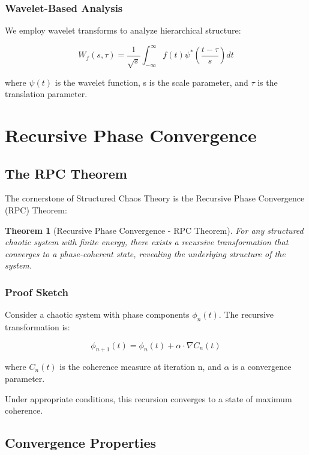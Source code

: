 \documentclass[12pt]{article}
\newtheorem{theorem}{Theorem}
\begin{document}
\subsubsection{Wavelet-Based Analysis}

We employ wavelet transforms to analyze hierarchical structure:

\begin{equation}
W_f(s,\tau) = \frac{1}{\sqrt{s}} \int_{-\infty}^{\infty} f(t) \psi^*\left(\frac{t-\tau}{s}\right) dt
\end{equation}

where $\psi(t)$ is the wavelet function, s is the scale parameter, and $\tau$ is the translation parameter.

\section{Recursive Phase Convergence}

\subsection{The RPC Theorem}

The cornerstone of Structured Chaos Theory is the Recursive Phase Convergence (RPC) Theorem:

\begin{theorem}[Recursive Phase Convergence - RPC Theorem]
For any structured chaotic system with finite energy, there exists a recursive transformation that converges to a phase-coherent state, revealing the underlying structure of the system.
\end{theorem}

\subsubsection{Proof Sketch}

Consider a chaotic system with phase components $\phi_n(t)$. The recursive transformation is:

\begin{equation}
\phi_{n+1}(t) = \phi_n(t) + \alpha \cdot \nabla C_n(t)
\end{equation}

where $C_n(t)$ is the coherence measure at iteration n, and $\alpha$ is a convergence parameter.

Under appropriate conditions, this recursion converges to a state of maximum coherence.

\subsection{Convergence Properties}
\end{document}
